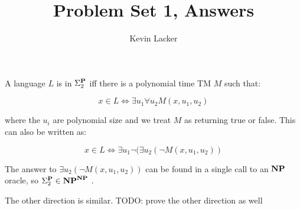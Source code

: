 \documentclass{article}
\newenvironment{problem}[2][Problem]{\begin{trivlist}
\item[\hskip \labelsep {\bfseries #1}\hskip \labelsep {\bfseries #2.}]}{\end{trivlist}}
\begin{document}
\title{Problem Set 1, Answers}
\author{Kevin Lacker}
\maketitle

\begin{problem}{1}

  A language $L$ is in $\Sigma_2^{\bf{P}}$ iff there is a polynomial time TM
  $M$ such that:

  \begin{equation}
    x \in L \iff \exists u_1 \forall u_2 M(x, u_1, u_2)
  \end{equation}

  where the $u_i$ are polynomial size and we treat $M$ as returning
  true or false. This can also be written as:

  \begin{equation}
    x \in L \iff \exists u_1 \neg ( \exists u_2 ( \neg M(x, u_1, u_2) )
  \end{equation}

  The answer to $\exists u_2 ( \neg M(x, u_1, u_2) )$ can be found
  in a single call to an $\bf{NP}$ oracle, so $\Sigma_2^{\bf{P}} \in
  \bf{NP}^{\bf{NP}}$ .

  The other direction is similar. TODO: prove the other direction as well
  
\end{problem}
\end{document}

